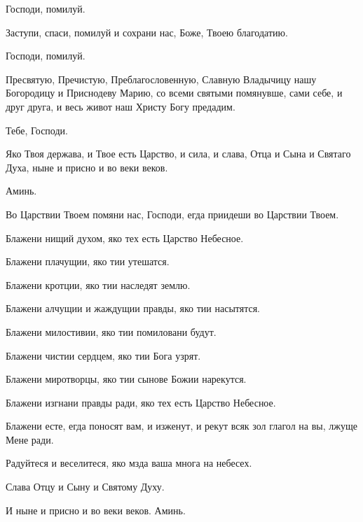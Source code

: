 \begin{mymulticols}
 Господи, помилуй. 

 Заступи, спаси, помилуй и сохрани нас, Боже, Твоею благодатию. 

 Господи, помилуй. 

 Пресвятую, Пречистую, Преблагословенную, Славную Владычицу нашу Богородицу и Приснодеву Марию, со всеми святыми помянувше, сами себе, и друг друга, и весь живот наш Христу Богу предадим.

 Тебе, Господи. 

 Яко Твоя держава, и Твое есть Царство, и сила, и слава, Отца и Сына и Святаго Духа, ныне и присно и во веки веков. 

 Аминь.



 Во Царствии Твоем помяни нас, Господи, егда приидеши во Царствии Твоем. 

 Блажени нищий духом, яко тех есть Царство Небесное. 

 Блажени плачущии, яко тии утешатся.

 Блажени кротции, яко тии наследят землю. 

 Блажени алчущии и жаждущии правды, яко тии насытятся.

 Блажени милостивии, яко тии помиловани будут. 

 Блажени чистии сердцем, яко тии Бога узрят.

 Блажени миротворцы, яко тии сынове Божии нарекутся. 

 Блажени изгнани правды ради, яко тех есть Царство Небесное.

 Блажени есте, егда поносят вам, и изженут, и рекут всяк зол глагол на вы, лжуще Мене ради. 

 Радуйтеся и веселитеся, яко мзда ваша многа на небесех. 

 Слава Отцу и Сыну и Святому Духу. 

 И ныне и присно и во веки веков. Аминь. 


\end{mymulticols}
